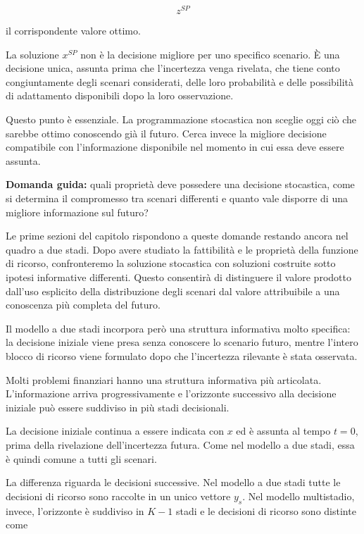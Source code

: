 \[
z^{SP}
\]

il corrispondente valore ottimo.

La soluzione $x^{SP}$ non \`e la decisione migliore per uno specifico
scenario. \`E una decisione unica, assunta prima che l'incertezza venga
rivelata, che tiene conto congiuntamente degli scenari considerati, delle loro
probabilit\`a e delle possibilit\`a di adattamento disponibili dopo la loro
osservazione.

Questo punto \`e essenziale. La programmazione stocastica non sceglie oggi
ci\`o che sarebbe ottimo conoscendo gi\`a il futuro. Cerca invece la migliore
decisione compatibile con l'informazione disponibile nel momento in cui essa
deve essere assunta.

\medskip

\noindent
\textbf{Domanda guida:} quali propriet\`a deve possedere una decisione
stocastica, come si determina il compromesso tra scenari differenti e quanto
vale disporre di una migliore informazione sul futuro?

\medskip

Le prime sezioni del capitolo rispondono a queste domande restando ancora nel
quadro a due stadi. Dopo avere studiato la fattibilit\`a e le propriet\`a
della funzione di ricorso, confronteremo la soluzione stocastica con soluzioni
costruite sotto ipotesi informative differenti. Questo consentir\`a di
distinguere il valore prodotto dall'uso esplicito della distribuzione degli
scenari dal valore attribuibile a una conoscenza pi\`u completa del futuro.

Il modello a due stadi incorpora per\`o una struttura informativa molto
specifica: la decisione iniziale viene presa senza conoscere lo scenario
futuro, mentre l'intero blocco di ricorso viene formulato dopo che
l'incertezza rilevante \`e stata osservata.

Molti problemi finanziari hanno una struttura informativa pi\`u articolata.
L'informazione arriva progressivamente e l'orizzonte successivo alla
decisione iniziale pu\`o essere suddiviso in pi\`u stadi decisionali.

La decisione iniziale continua a essere indicata con $x$ ed \`e assunta al
tempo $t=0$, prima della rivelazione dell'incertezza futura. Come nel modello
a due stadi, essa \`e quindi comune a tutti gli scenari.

La differenza riguarda le decisioni successive. Nel modello a due stadi tutte
le decisioni di ricorso sono raccolte in un unico vettore $y_s$. Nel modello
multistadio, invece, l'orizzonte \`e suddiviso in $K-1$ stadi e le decisioni di
ricorso sono distinte come

